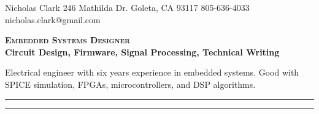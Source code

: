 \documentclass[letterpaper, 10pt]{article}
\begin{document}
\nrctitle
{Nicholas Clark}
{246 Mathilda Dr.}
{Goleta, CA 93117}
{805-636-4033}
{nicholas.clark@gmail.com}
%
\begin{center}
\Large \textbf{\textsc{Embedded Systems Designer}}\\
\large \textbf{{Circuit Design, Firmware, Signal Processing, Technical Writing}}\par
\smallskip
Electrical engineer with six years experience in embedded systems. 
Good with SPICE simulation, FPGAs, microcontrollers, and DSP algorithms. 
\end{center}
\smallskip
\hrule
\smallskip


\begin{parcolumns}[nofirstindent, colwidths={1=.15\linewidth}]{2}
\end{parcolumns}
\par\smallskip
\hrule
\smallskip
\end{document}
